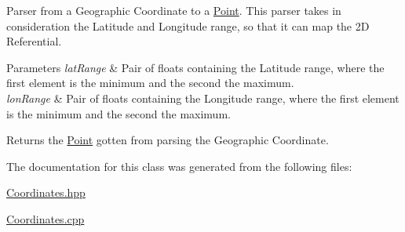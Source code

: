 Parser from a Geographic Coordinate to a \hyperlink{class_point}{Point}. This parser takes in consideration the Latitude and Longitude range, so that it can map the 2D Referential.


\begin{DoxyParams}{Parameters}
{\em lat\+Range} & Pair of floats containing the Latitude range, where the first element is the minimum and the second the maximum. \\
\hline
{\em lon\+Range} & Pair of floats containing the Longitude range, where the first element is the minimum and the second the maximum.\\
\hline
\end{DoxyParams}
\begin{DoxyReturn}{Returns}
the \hyperlink{class_point}{Point} gotten from parsing the Geographic Coordinate. 
\end{DoxyReturn}


The documentation for this class was generated from the following files\+:\begin{DoxyCompactItemize}
\item 
\hyperlink{_coordinates_8hpp}{Coordinates.\+hpp}\item 
\hyperlink{_coordinates_8cpp}{Coordinates.\+cpp}\end{DoxyCompactItemize}
